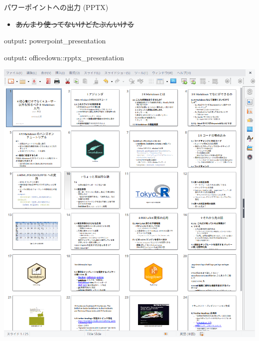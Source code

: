 \documentclass[
  ignorenonframetext,
]{beamer}
\newenvironment{Shaded}{\begin{snugshade}}{\end{snugshade}}
\newcommand{\AttributeTok}[1]{\textcolor[rgb]{0.77,0.63,0.00}{#1}}
\newcommand{\FunctionTok}[1]{\textcolor[rgb]{0.00,0.00,0.00}{#1}}
\newcommand{\KeywordTok}[1]{\textcolor[rgb]{0.13,0.29,0.53}{\textbf{#1}}}
\providecommand{\tightlist}{%
  \setlength{\itemsep}{0pt}\setlength{\parskip}{0pt}}
\begin{document}
\begin{frame}[fragile]{パワーポイントへの出力 (PPTX)}
\protect\hypertarget{ux30d1ux30efux30fcux30ddux30a4ux30f3ux30c8ux3078ux306eux51faux529b-pptx}{}
\begin{itemize}
\tightlist
\item
  \sout{あんまり使ってないけどたぶんいける}
\end{itemize}

\begin{Shaded}
\begin{Highlighting}[]
\FunctionTok{output}\KeywordTok{:}\AttributeTok{ powerpoint\_presentation}
\end{Highlighting}
\end{Shaded}

\begin{Shaded}
\begin{Highlighting}[]
\FunctionTok{output}\KeywordTok{:}\AttributeTok{ officedown::rpptx\_presentation}
\end{Highlighting}
\end{Shaded}

\begin{center}\includegraphics[width=1\linewidth,height=1\textheight,keepaspectratio]{img/powerpoint} \end{center}
\end{frame}
\end{document}
